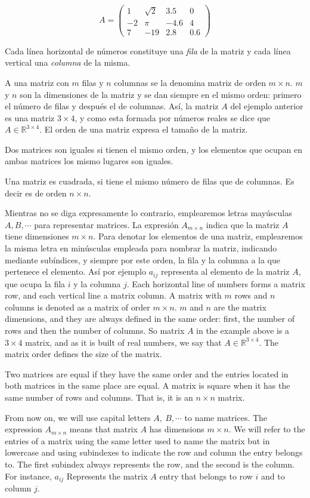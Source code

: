 \begin{equation*}
A=
\begin{pmatrix}
1& \sqrt{2}& 3.5& 0\\
-2& \pi& -4.6& 4\\
7& -19& 2.8& 0.6
\end{pmatrix}
\end{equation*}

\begin{paracol}{2}
Cada línea horizontal de números constituye una \emph{fila} de la matriz y cada línea vertical una \emph{columna} de la misma.

A una matriz con $m$ filas y $n$ columnas se la denomina matriz de orden $m\times n$. $m$ y $n$ son la dimensiones de la matriz y se dan siempre en el mismo orden: primero el número de filas y después el de columnas. Así, la matriz $A$ del ejemplo anterior es una matriz $3\times 4$, y como esta formada por números reales se dice que $A\in\mathbb{R}^{3\times 4}$. El orden de una matriz expresa el tamaño de la matriz.

Dos matrices son iguales si tienen el mismo orden, y los elementos que ocupan en ambas matrices los mismo lugares son iguales.

Una matriz es cuadrada, si tiene el mismo número de filas que de columnas. Es decir es de orden $n\times n$.

Mientras no se diga expresamente lo contrario, emplearemos letras mayúsculas $A, B, \cdots$ para representar matrices. La expresión $A_{m\times n}$ indica que la matriz $A$ tiene dimensiones $m \times n$. Para denotar los elementos de una matriz, emplearemos la misma letra en minúsculas empleada para nombrar la matriz, indicando mediante subíndices, y siempre por este orden, la fila y la columna a la que pertenece el elemento. Así por ejemplo $a_{ij}$ representa al elemento de la matriz $A$, que ocupa la fila $i$ y la columna $j$.
\switchcolumn
Each horizontal line of numbers forms a matrix row, and each vertical line a matrix column.
A matrix with $m$ rows and $n$ columns is denoted as a matrix of order $m\times n$. $m$ and $n$ are the matrix dimensions, and they are always defined in the same order: first, the number of rows and then the number of columns. So matrix $A$ in the example above is a $3\times 4$ matrix, and as it is built of real numbers, we say that $A\in \mathbb{R}^{3\times 4}$. The matrix order defines the size of the matrix.

Two matrices are equal if they have the same order and the entries located in both matrices in the same place are equal. A matrix is square when it has the same number of rows and columns. That is, it is an $n\times n$ matrix.

From now on, we will use capital letters $A,\ B,\cdots$ to name matrices. The expression $A_{m\times n}$ means that matrix $A$ has dimensions $m\times n$. We will refer to the entries of a matrix using the same letter used to name the matrix but in lowercase and using subindexes to indicate the row and column the entry belongs to. The first subindex always represents the row, and the second is the column. For instance, $a_{ij}$ Represents the matrix $A$ entry that belongs to row $i$ and to column $j$.
\end{paracol}
